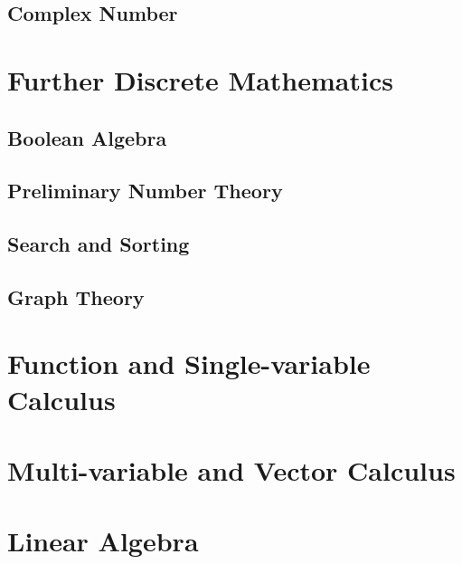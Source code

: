 \documentclass[
	12pt, %
	fleqn, %
	a4paper, %
]{LegrandOrangeBook}
\begin{document}
\chapter{Complex Number}

\part{Further Discrete Mathematics}


\chapterspaceabove{6.75cm} 
\chapterspacebelow{7.25cm} 
\chapter{Boolean Algebra}

\chapterspaceabove{6.75cm} 
\chapterspacebelow{7.25cm} 
\chapter{Preliminary Number Theory}
\chapterspaceabove{6.75cm} 
\chapterspacebelow{7.25cm} 
\chapter{Search and Sorting}
\chapterspaceabove{6.75cm} 
\chapterspacebelow{7.25cm} 
\chapter{Graph Theory}

\part{Function and Single-variable Calculus}
\part{Multi-variable and Vector Calculus}

\part{Linear Algebra}
\end{document}
